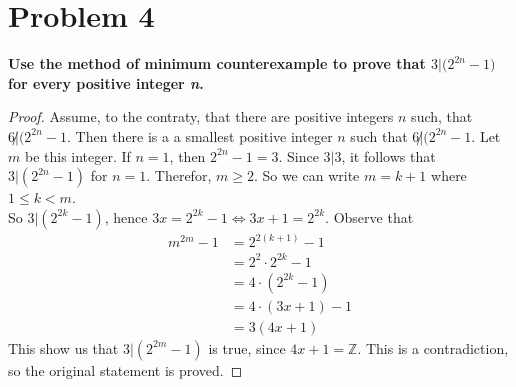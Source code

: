 \documentclass[english,11pt,a4paper]{article}
\begin{document}
\section*{Problem 4}
\textbf{Use the method of minimum counterexample to prove that $3|\Big(2^{2n}-1\Big)$ for every positive integer \textit{n}.}
\begin{proof}
Assume, to the contraty, that there are positive integers $n$ such, that $6\not |(2^{2n}-1$. Then there is a a smallest positive integer $n$ such that $6\not |(2^{2n}-1$.
Let $m$ be this integer.
If $n=1$, then $2^{2n}-1 =3$.
Since $3|3$, it follows that $3|(2^{2n}-1)$ for $n=1$. Therefor, $m\geq 2$. So we can write $m=k+1$ where $1\leq k< m$. 
\\
So $3|(2^{2k}-1)$, hence $3x = 2^{2k}-1 \Leftrightarrow 3x+1 = 2^{2k}$.
Observe that
\begin{align}
m^{2m}-1 &= 2^{2(k+1)} -1 \\
	&= 2^2 \cdot 2^{2k} -1\\
	&=4\cdot (2^{2k}-1)\\
	&=4\cdot (3x+1)-1\\
	&=3(4x+1)
\end{align}
This show us  that $3|(2^{2m}-1)$ is true, since $4x + 1 = \mathbb{Z}$.
This is a contradiction, so the original statement is proved.
\end{proof}
\end{document}
